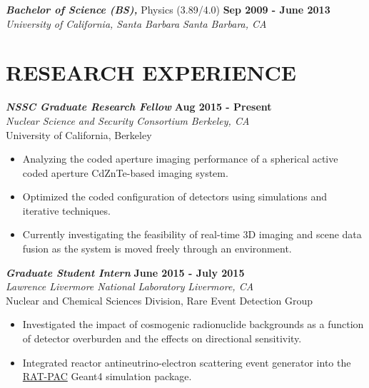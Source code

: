 \documentclass[margin, 10pt]{style/res} %
\begin{document}
\begin{resume}
{\sl\bf Bachelor of Science (BS),} Physics (3.89/4.0) \hfill {\bf Sep 2009 - June 2013} \\
{\sl University of California, Santa Barbara} \hfill {\sl Santa Barbara, CA}
\vspace{2pt}


 

 
\section{\small{RESEARCH EXPERIENCE}}

{\sl\bf NSSC Graduate Research Fellow} \hfill {\bf Aug 2015 - Present} \\
{\sl Nuclear Science and Security Consortium} \hfill {\sl Berkeley, CA}\\
University of California, Berkeley
\vspace{2pt}
\begin{itemize}[leftmargin=4ex] \itemsep -2pt
\item Analyzing the coded aperture imaging performance of a spherical active coded aperture CdZnTe-based imaging system.
\item Optimized the coded configuration of detectors using simulations and iterative techniques.
\item Currently investigating the feasibility of real-time 3D imaging and scene data fusion as the system is moved freely through an environment.   
\end{itemize} 

{\sl\bf Graduate Student Intern} \hfill {\bf June 2015 - July 2015} \\
{\sl Lawrence Livermore National Laboratory} \hfill {\sl Livermore, CA}\\
Nuclear and Chemical Sciences Division, Rare Event Detection Group
\vspace{2pt}
\begin{itemize}[leftmargin=4ex] \itemsep -2pt
\item Investigated the impact of cosmogenic radionuclide backgrounds as a function of detector overburden and the effects on directional sensitivity.
\item Integrated reactor antineutrino-electron scattering event generator into the \href{https://github.com/rat-pac/rat-pac}{RAT-PAC} Geant4 simulation package.
\end{itemize} 


\end{resume}
\end{document}
